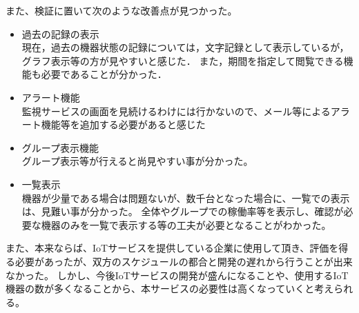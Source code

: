 また、検証に置いて次のような改善点が見つかった。
\begin{itemize}
\item 過去の記録の表示\\
	現在，過去の機器状態の記録については，文字記録として表示しているが，グラフ表示等の方が見やすいと感じた．
	また，期間を指定して閲覧できる機能も必要であることが分かった．
\item アラート機能\\
	監視サービスの画面を見続けるわけには行かないので、メール等によるアラート機能等を追加する必要があると感じた
\item グループ表示機能\\
	グループ表示等が行えると尚見やすい事が分かった。
\item 一覧表示\\
	機器が少量である場合は問題ないが、数千台となった場合に、一覧での表示は、見難い事が分かった。
	全体やグループでの稼働率等を表示し、確認が必要な機器のみを一覧で表示する等の工夫が必要となることがわかった。
\end{itemize}
また、本来ならば、IoTサービスを提供している企業に使用して頂き、評価を得る必要があったが、双方のスケジュールの都合と開発の遅れから行うことが出来なかった。
しかし、今後IoTサービスの開発が盛んになることや、使用するIoT機器の数が多くなることから、本サービスの必要性は高くなっていくと考えられる。

